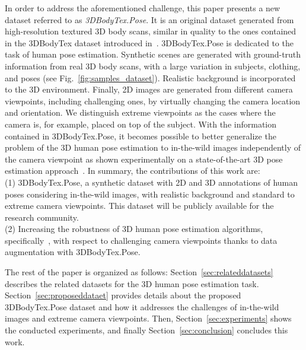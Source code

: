 \documentclass{article}
\begin{document}
In order to address the aforementioned challenge, this paper presents a new dataset referred to as \emph{3DBodyTex.Pose}. It is an original dataset generated from high-resolution textured 3D body scans, similar in quality to the ones contained in the 3DBodyTex dataset introduced in~\cite{Saint20183DBodyTexT3}. 3DBodyTex.Pose is dedicated to the task of human pose estimation. Synthetic scenes are generated with ground-truth information from real 3D body scans, with a large variation in subjects, clothing, and poses (see Fig.~\ref{fig:samples_dataset}). Realistic background is incorporated to the 3D environment. Finally, 2D images are generated from different camera viewpoints, including challenging ones, by virtually changing the camera location and orientation. We distinguish extreme viewpoints as the cases where the camera is, for example, placed on top of the subject. With the information contained in 3DBodyTex.Pose, it becomes possible to better generalize the problem of the 3D human pose estimation to in-the-wild images independently of the camera viewpoint as shown experimentally on a state-of-the-art 3D pose estimation approach~\cite{zhou2017towards}.
In summary, the contributions of this work are: \\
(1) 3DBodyTex.Pose, a synthetic dataset with 2D and 3D annotations of human poses considering in-the-wild images, with realistic background and standard to extreme camera viewpoints. This dataset will be publicly available for the research community.\\
(2) Increasing the robustness of 3D human pose estimation algorithms, specifically~\cite{zhou2017towards}, with respect to challenging camera viewpoints thanks to data augmentation with 3DBodyTex.Pose. 

The rest of the paper is organized as follows: Section~\ref{sec:relateddatasets} describes the related datasets for the 3D human pose estimation task. Section~\ref{sec:proposeddataet} provides details about the proposed 3DBodyTex.Pose dataset and how it addresses the challenges of in-the-wild images and extreme camera viewpoints. Then, Section~\ref{sec:experiments} shows the conducted experiments, and finally Section~\ref{sec:conclusion} concludes this work.



\vspace{-0.1cm}
\end{document}
